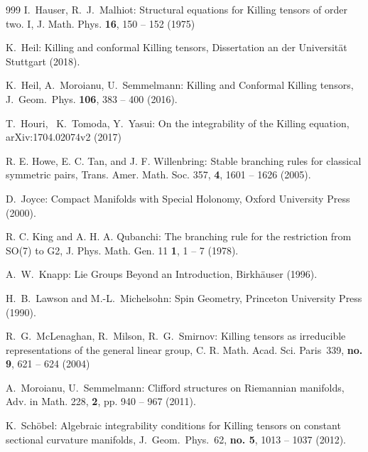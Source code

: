 \documentclass[11pt,a4paper]{article}
\theoremstyle{plain}
\theoremstyle{remark}
\begin{document}
\begin{thebibliography}{999}
 I.~Hauser, R.~J.~Malhiot:
\newblock Structural equations for Killing tensors of order two. I,
\newblock J. Math. Phys. {\bf 16}, 150 -- 152 (1975)


 K.~Heil:
\newblock Killing and conformal Killing tensors,
\newblock Dissertation an der Universität Stuttgart (2018).


 K.~Heil, A.~Moroianu, U.~Semmelmann:
\newblock Killing and Conformal Killing tensors,
\newblock J.~Geom.~Phys. {\bf 106}, 383 -- 400 (2016).

 T.~Houri,~ K.~Tomoda, Y.~Yasui:
\newblock On the integrability of the Killing equation,
\newblock arXiv:1704.02074v2 (2017)

 R. E. Howe, E. C. Tan, and J. F. Willenbring: 
\newblock Stable branching rules for classical symmetric pairs,
\newblock Trans. Amer. Math. Soc. 357, {\bf 4}, 1601 -- 1626 (2005).

 D.~Joyce:
\newblock Compact Manifolds with Special Holonomy,
\newblock Oxford University Press (2000).




 R. C. King and A. H. A. Qubanchi: 
\newblock The branching rule for the restriction from SO(7) to G2,
\newblock J. Phys. Math. Gen. 11 {\bf 1}, 1 -- 7 (1978).

 A.~W.~Knapp: 
\newblock Lie Groups Beyond an Introduction,
\newblock Birkhäuser (1996). 


 H.~B.~Lawson and M.-L.~Michelsohn:
\newblock Spin Geometry,
\newblock Princeton University Press (1990).

 R.~G.~McLenaghan, R.~Milson, R.~G.~Smirnov:
\newblock Killing tensors as irreducible representations of the general linear group,
\newblock  C. R. Math. Acad. Sci. Paris~339, {\bf no. 9}, 621 -- 624 (2004)


 A.~Moroianu, U.~Semmelmann:
\newblock Clifford structures on Riemannian manifolds,
\newblock  Adv. in Math. 228, {\bf 2}, pp. 940 -- 967 (2011).

 K.~Sch\"obel:
\newblock Algebraic integrability conditions for Killing tensors on constant sectional curvature manifolds,
\newblock J.~Geom.~Phys.~62, {\bf no. 5}, 1013 -- 1037 (2012).


\end{thebibliography}
\end{document}
